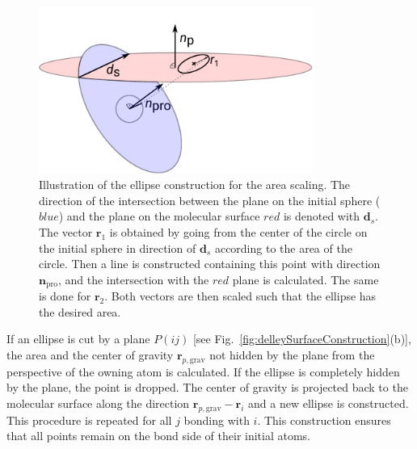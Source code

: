 \begin{figure}[!ht]
	\centering
	\includegraphics[width=0.8\textwidth]{figs/ellipseConstruction.pdf}
	\caption{Illustration of the ellipse construction for the area scaling.
	         The direction of the intersection between the plane on the initial sphere ($blue$)
	         and the plane on the molecular surface $red$ is denoted with $\pmb{d}_s$.
	         The vector $\pmb{r}_1$ is obtained by going from the center of the circle on the
	         initial sphere in direction of $\pmb{d}_s$ according to the area of the circle.
	         Then a line is constructed containing this point with direction $\pmb{n}_\mathrm{pro}$,
	         and the intersection with the $red$ plane is calculated. The same is done for $\pmb{r}_2$.
	         Both vectors are then scaled such that the ellipse has the desired area.}
	\label{fig:ellipseConstruction}
\end{figure}

If an ellipse is cut by a plane $P(ij)$ [see Fig.~\ref{fig:delleySurfaceConstruction}(b)], the area and the center
of gravity $\pmb{r}_{p,\mathrm{grav}}$ not hidden by the plane from the perspective of the owning atom is calculated.
If the ellipse is completely hidden by the plane, the point is dropped.
The center of gravity is projected back to the molecular surface along the direction
$\pmb{r}_{p,\mathrm{grav}}-\pmb{r}_i$ and a new ellipse is constructed. This procedure is repeated for all $j$ bonding
with $i$. This construction ensures that all points remain on the bond side of their initial atoms.
